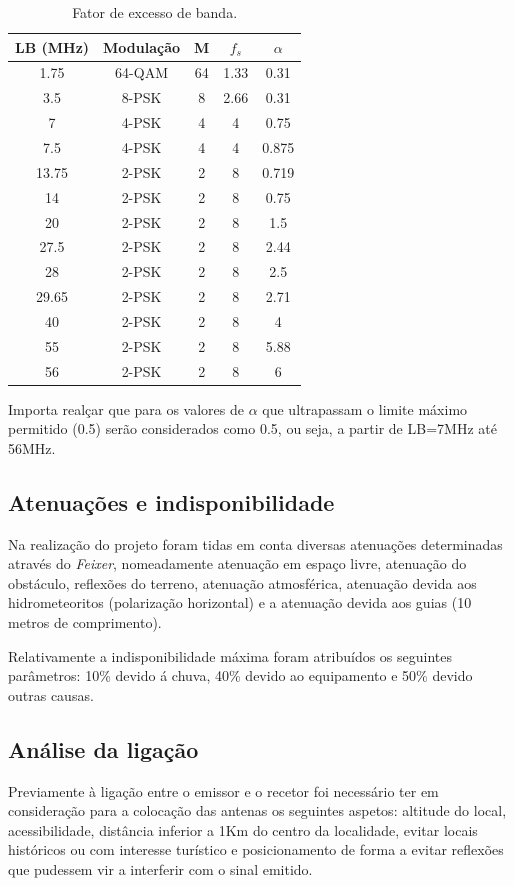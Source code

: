 \begin{table}[H]
\centering
\begin{tabular}{|c|c|c|c|c|}
\hline
LB (MHz) & Modulação & M & $f_{s}$ & $\alpha$ \\
\hline
1.75 & 64-QAM & 64 & 1.33 & 0.31\\
3.5 & 8-PSK & 8	& 2.66 & 0.31\\
7 & 4-PSK & 4 & 4 & 0.75\\
7.5 & 4-PSK & 4 & 4 & 0.875\\
13.75 & 2-PSK & 2 & 8 & 0.719\\
14 & 2-PSK & 2 & 8 & 0.75\\
20 & 2-PSK & 2 & 8 & 1.5\\
27.5 & 2-PSK & 2 & 8 & 2.44\\
28 & 2-PSK & 2 & 8 & 2.5\\
29.65 & 2-PSK & 2 & 8 & 2.71\\
40 & 2-PSK & 2 & 8 & 4\\
55 & 2-PSK & 2 & 8 & 5.88\\
56 & 2-PSK & 2 & 8 & 6\\
\hline
\end{tabular}
\caption{Fator de excesso de banda.}
\label{fatorExcessoBanda}
\end{table}
Importa realçar que para os valores de $\alpha$ que ultrapassam o limite máximo permitido (0.5) serão considerados como 0.5, ou seja, a partir de LB=7MHz até 56MHz.

\subsection{Atenuações e indisponibilidade}
Na realização do projeto foram tidas em conta diversas atenuações determinadas através do \textit{Feixer}, nomeadamente atenuação em espaço livre, atenuação do obstáculo, reflexões do terreno, atenuação atmosférica, atenuação devida aos hidrometeoritos (polarização horizontal) e a atenuação devida aos guias (10 metros de comprimento).

Relativamente a indisponibilidade máxima foram atribuídos os seguintes parâmetros: 10\% devido á chuva, 40\% devido ao equipamento e 50\% devido outras causas.


\subsection{Análise da ligação}
Previamente à ligação entre o emissor e o recetor foi necessário ter em consideração para a colocação das antenas os seguintes aspetos: altitude do local, acessibilidade, distância inferior a 1Km do centro da localidade, evitar locais históricos ou com interesse turístico e posicionamento de forma a evitar reflexões que pudessem vir a interferir com o sinal emitido. 


